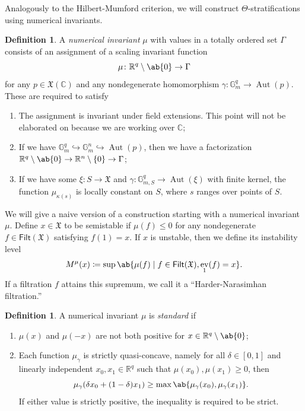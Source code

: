 \documentclass{amsart}
\theoremstyle{definition}
\newtheorem{defn}[thm]{Definition}
\theoremstyle{remark}
\theoremstyle{plain}
\theoremstyle{definition}
\theoremstyle{remark}
\newcommand{\G}{\mathbb{G}}
\newcommand{\R}{\mathbb{R}}
\newcommand{\C}{\mathbb{C}}
\newcommand{\mf}[1]{\mathfrak{#1}}
\newcommand{\ms}[1]{\mathsf{#1}}
\newcommand{\1}{\mathbf{1}}
\newcommand{\2}{\mathbf{2}}
\newcommand{\3}{\mathbf{3}}
\DeclareMathOperator{\Aut}{Aut}
\DeclareMathOperator{\ev}{ev}
\begin{document}
Analogously to the Hilbert-Mumford criterion, we will construct \(\Theta\)-stratifications using numerical invariants.
\begin{defn}
    A \textit{numerical invariant} \(\mu\) with values in a totally ordered set \(\Gamma\) consists of an assignment of a scaling invariant function
    \[ \mu \colon \R^q \setminus \ab\{0\} \to \Gamma \]
    for any \(p \in \mf{X}(\C)\) and any nondegenerate homomorphism \(\gamma \colon \G_m^q \to \Aut(p)\). These are required to satisfy
    \begin{enumerate}
        \item The assignment is invariant under field extensions. This point will not be elaborated on because we are working over \(\C\);
        \item If we have \(\G_m^q \hookrightarrow \G_m^n \hookrightarrow \Aut(p)\), then we have a factorization \(\R^q \setminus \ab\{0\} \to \R^n \setminus \{0\} \to \Gamma\);
        \item If we have some \(\xi \colon S \to \mf{X}\) and \(\gamma \colon \G_{m, S}^q \to \Aut(\xi)\) with finite kernel, the function \(\mu_{\kappa(s)}\) is locally constant on \(S\), where \(s\) ranges over points of \(S\).
    \end{enumerate}
\end{defn}

We will give a naive version of a construction starting with a numerical invariant \(\mu\). Define \(x \in \mf{X}\) to be semistable if \(\mu(f) \leq 0\) for any nondegenerate \(f \in \ms{Filt}(\mf{X})\) satisfying \(f(1) = x\). If \(x\) is unstable, then we define its instability level
\[ M^{\mu}(x) \coloneqq \sup \ab\{ \mu(f) \mid f \in \ms{Filt}(\mf{X}), \ev_1(f) = x\}. \]
If a filtration \(f\) attains this supremum, we call it a ``Harder-Narasimhan filtration.''

\begin{defn}
    A numerical invariant \(\mu\) is \textit{standard} if
    \begin{enumerate}
        \item \(\mu(x)\) and \(\mu(-x)\) are not both positive for \(x \in \R^q \setminus \ab\{0\}\);
        \item Each function \(\mu_{\gamma}\) is strictly quasi-concave, namely for all \(\delta \in [0,1]\) and linearly independent \(x_0, x_1 \in \R^q\) such that \(\mu(x_0), \mu(x_1) \geq 0\), then 
            \[\mu_{\gamma}(\delta x_0 + (1-\delta)x_1) \geq \max\ab\{\mu_{\gamma}(x_0), \mu_{\gamma}(x_1)\}.\] If either value is strictly positive, the inequality is required to be strict.
    \end{enumerate}
\end{defn}
\end{document}

